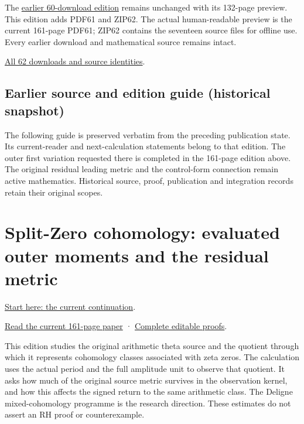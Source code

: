 \documentclass[
]{article}
\begin{document}
The \href{https://doi.org/10.5281/zenodo.22759221}{earlier 60-download
edition} remains unchanged with its 132-page preview. This edition adds
PDF61 and ZIP62. The actual human-readable preview is the current
161-page PDF61; ZIP62 contains the seventeen source files for offline
use. Every earlier download and mathematical source remains intact.

\href{calculation_edition_20260915_first_variation/README.md}{All 62
downloads and source identities}.

\subsection{Earlier source and edition guide (historical
snapshot)}\label{earlier-source-and-edition-guide-historical-snapshot-6}

The following guide is preserved verbatim from the preceding publication
state. Its current-reader and next-calculation statements belong to that
edition. The outer first variation requested there is completed in the
161-page edition above. The original residual leading metric and the
control-form connection remain active mathematics. Historical source,
proof, publication and integration records retain their original scopes.

\section{Split-Zero cohomology: evaluated outer moments and the residual
metric}\label{split-zero-cohomology-evaluated-outer-moments-and-the-residual-metric}

\href{https://github.com/KokunoYumeto/zeta-function-research-reader/blob/main/workbenches/splitzero-tandem/continuations/20260915-first-variation-continuation/00_CONTINUE_HERE.md}{Start
here: the current continuation}.

\href{https://github.com/KokunoYumeto/zeta-function-research-reader/blob/main/workbenches/splitzero-tandem/continuations/20260915-first-variation-continuation/15_CURRENT_MIXED_CONTROL_READER.pdf}{Read
the current 161-page paper} ·
\href{https://github.com/KokunoYumeto/zeta-function-research-reader/blob/main/workbenches/splitzero-tandem/continuations/20260915-first-variation-continuation/14_CURRENT_KERNEL_AND_MULTIPLICITY_PROOFS.tex}{Complete
editable proofs}.

This edition studies the original arithmetic theta source and the
quotient through which it represents cohomology classes associated with
zeta zeros. The calculation uses the actual period and the full
amplitude unit to observe that quotient. It asks how much of the
original source metric survives in the observation kernel, and how this
affects the signed return to the same arithmetic class. The Deligne
mixed-cohomology programme is the research direction. These estimates do
not assert an RH proof or counterexample.
\end{document}
